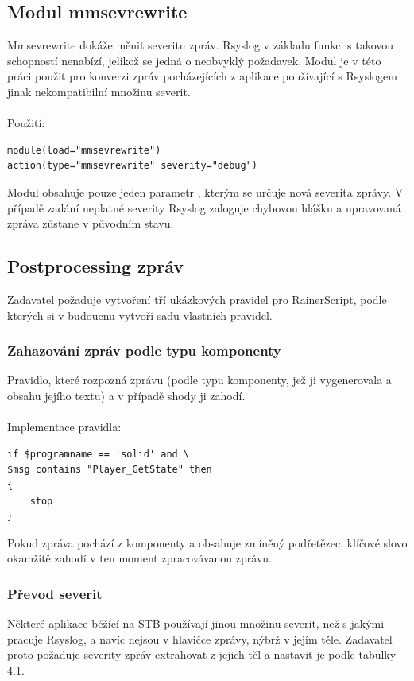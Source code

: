 \documentclass[thesis=B,czech]{FITthesis}[2012/06/26]
\begin{document}
\subsection{Modul mmsevrewrite}
Mmsevrewrite dokáže měnit severitu zpráv. Rsyslog v základu funkci s takovou schopností nenabízí, jelikož se jedná o neobvyklý požadavek. Modul je v této práci použit  pro konverzi zpráv pocházejících z aplikace používající s Rsyslogem jinak nekompatibilní množinu severit.
\\
\\
Použití:
\begin{lstlisting}[style=RainerScriptSimpleStyle]
module(load="mmsevrewrite")
action(type="mmsevrewrite" severity="debug")
\end{lstlisting}

Modul obsahuje pouze jeden parametr , kterým se určuje nová severita zprávy. V případě zadání neplatné severity Rsyslog zaloguje chybovou hlášku a upravovaná zpráva zůstane v původním stavu.

\subsection{Postprocessing zpráv}
Zadavatel požaduje vytvoření tří ukázkových pravidel pro RainerScript, podle kterých si v budoucnu vytvoří sadu vlastních pravidel.

\subsubsection{Zahazování zpráv podle typu komponenty}
Pravidlo, které rozpozná zprávu (podle typu komponenty, jež ji vygenerovala a obsahu jejího textu) a v případě shody ji zahodí.
\\
\\
Implementace pravidla:
\begin{lstlisting}[style=RainerScriptStyle]
if $programname == 'solid' and \
$msg contains "Player_GetState" then
{	
	stop
}
\end{lstlisting}
Pokud zpráva pochází z komponenty  a obsahuje zmíněný podřetězec, klíčové slovo  okamžitě zahodí v ten moment zpracovávanou zprávu.
\\
\subsubsection{Převod severit}
Některé aplikace běžící na STB používají jinou množinu severit, než s jakými pracuje Rsyslog, a navíc nejsou v hlavičce zprávy, nýbrž v jejím těle.
Zadavatel proto požaduje severity zpráv extrahovat z jejich těl a nastavit je podle tabulky 4.1.
\end{document}
